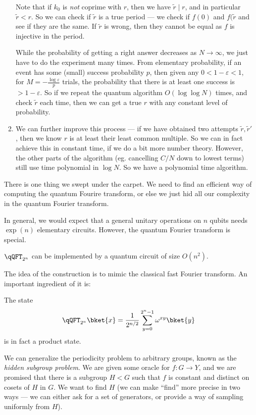 \documentclass[a4paper]{article}
\begin{document}
\begin{eg}
\begin{enumerate}
      Note that if $k_0$ is \emph{not} coprime with $r$, then we have $\tilde{r} \mid r$, and in particular $\tilde{r} < r$. So we can check if $\tilde{r}$ is a true period --- we check if $f(0)$ and $f(\tilde{r}$ and see if they are the same. If $\tilde{r}$ is wrong, then they cannot be equal as $f$ is injective in the period.

      While the probability of getting a right answer decreases as $N \to \infty$, we just have to do the experiment many times. From elementary probability, if an event has some (small) success probability $p$, then given any $0 < 1 - \varepsilon < 1$, for $M = - \frac{\log \varepsilon}{p}$ trials, the probability that there is at least one success is $ > 1 - \varepsilon$. So if we repeat the quantum algorithm $O(\log \log N)$ times, and check $\tilde{r}$ each time, then we can get a true $r$ with any constant level of probability.
    \item We can further improve this process --- if we have obtained two attempts $\tilde{r}, \tilde{r}'$, then we know $r$ is at least their least common multiple. So we can in fact achieve this in constant time, if we do a bit more number theory. However, the other parts of the algorithm (eg. cancelling $C/N$ down to lowest terms) still use time polynomial in $\log N$. So we have a polynomial time algorithm.
  \end{enumerate}
\end{eg}

There is one thing we swept under the carpet. We need to find an efficient way of computing the quantum Fourire transform, or else we just hid all our complexity in the quantum Fourier transform.

In general, we would expect that a general unitary operations on $n$ qubits needs $\exp(n)$ elementary circuits. However, the quantum Fourier transform is special.

\begin{fact}
  $\qQFT_{2^n}$ can be implemented by a quantum circuit of size $O(n^2)$.
\end{fact}
The idea of the construction is to mimic the classical fast Fourier transform. An important ingredient of it is:
\begin{fact}
  The state
  \[
    \qQFT_{2^n} \bket{x} = \frac{1}{2^{n/2}} \sum_{y = 0}^{2^n - 1} \omega^{xy}\bket{y}
  \]
  is in fact a product state.
\end{fact}
We can generalize the periodicity problem to arbitrary groups, known as the \emph{hidden subgroup problem}. We are given some oracle for $f: G \to Y$, and we are promised that there is a subgroup $H < G$ such that $f$ is constant and distinct on cosets of $H$ in $G$. We want to find $H$ (we can make ``find'' more precise in two ways --- we can either ask for a set of generators, or provide a way of sampling uniformly from $H$).
\end{document}
